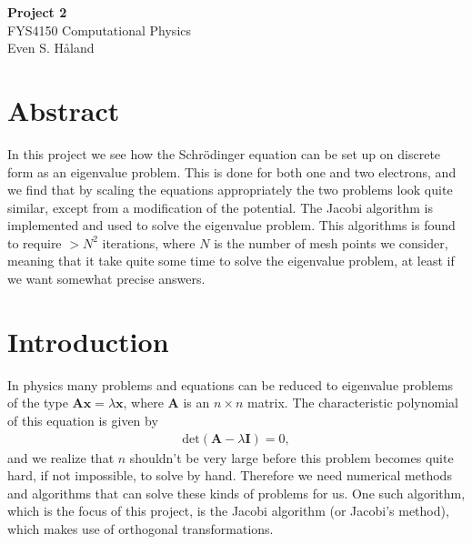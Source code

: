 \documentclass[12pt, a4paper]{article}
\begin{document}
\begin{titlepage}
\begin{center}
\vspace*{3cm}
\Huge
\textbf{Project 2} \\
\Large  
FYS4150 Computational Physics 
\vspace*{3cm} \\ 

Even S. Håland 
\vspace*{5cm} \\

\normalsize
\section*{Abstract}

In this project we see how the Schrödinger equation can be set up on discrete form as an eigenvalue
problem. This is done for both one and two electrons, and we find that by scaling the equations
appropriately the two problems look quite similar, except from a modification of the potential. The 
Jacobi algorithm is implemented and used to solve the eigenvalue problem. This algorithms is found to 
require $> N^2$ iterations, where $N$ is the number of mesh points we consider, meaning that it take 
quite some time to solve the eigenvalue problem, at least if we want somewhat precise answers. 

\end{center}
\end{titlepage}

\section{Introduction}

In physics many problems and equations can be reduced to eigenvalue problems of the type 
$\mathbf{Ax}=\lambda \mathbf{x}$, where $\mathbf{A}$ is an $n\times n$ matrix. The characteristic
polynomial of this equation is given by 
\begin{align*}
\mbox{det}\left(\mathbf{A}-\lambda \mathbf{I}\right) = 0, 
\end{align*}
and we realize that $n$ shouldn't be very large before this problem becomes quite hard, if not impossible, 
to solve by hand. Therefore we need numerical methods and algorithms that can solve these kinds of 
problems for us. One such algorithm, which is the focus of this project, is the Jacobi algorithm (or 
Jacobi's method), which makes use of orthogonal transformations. 
\end{document}
